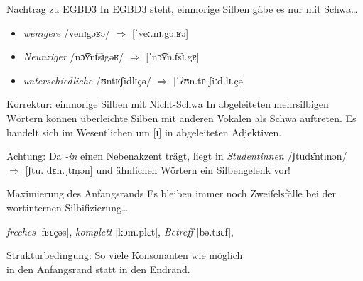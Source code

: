 \begin{frame}
  {Nachtrag zu EGBD3}
  \pause
  In EGBD3 steht, einmorige Silben gäbe es nur mit Schwa\ldots
  \pause
  \Zeile
  \begin{itemize}[<+->]
    \item \textit{wenigere} /venɪgəʁə/ $\Rightarrow$ [ˈveː.nɪ.gə.ʁə]
    \item \textit{Neunziger} /nɔ͡ʏnt͡sɪgəʁ/ $\Rightarrow$ [ˈnɔ͡ʏn.t͡sɪ.gɐ]
    \item \textit{unterschiedliche} /ʊntʁʃidlɪçə/ $\Rightarrow$ [ˈʔʊn.tɐ.ʃiːd.lɪ.çə]
  \end{itemize}
  \pause
  \begin{alertblock}{Korrektur: einmorige Silben mit Nicht-Schwa}
    In abgeleiteten mehrsilbigen Wörtern können überleichte Silben mit anderen Vokalen als Schwa auftreten.
    Es handelt sich im Wesentlichen um [ɪ] in abgeleiteten Adjektiven.
  \end{alertblock}
  \pause
  \Zeile
  Achtung: Da \textit{-in} einen Nebenakzent trägt, liegt in \textit{Studentinnen} /ʃtudɛ̆ntɪnən/ $\Rightarrow$ [ʃtu.ˈdɛn.ˌtɪṇən] und ähnlichen Wörtern ein Silbengelenk vor!
\end{frame}


\begin{frame}
  {Maximierung des Anfangsrands}
  \pause
  Es bleiben immer noch Zweifelsfälle bei der wortinternen Silbifizierung\dots\\
  \pause
  \Zeile
  \begin{exe}
    \ex\textit{freches} \alert{[fʁɛç̣əs]}, \rot{*[fʁɛç.əs]}
    \pause
    \ex\textit{komplett} \alert{[kɔm.plɛt]}, 
    \pause
    \ex\textit{Betreff} \alert{[bə.tʁɛf]}, 
  \end{exe}
  \Zeile
  \pause
  \Large
  Strukturbedingung: So viele Konsonanten wie möglich\\
  in den \alert{Anfangsrand} statt in den Endrand.\\
\end{frame}



